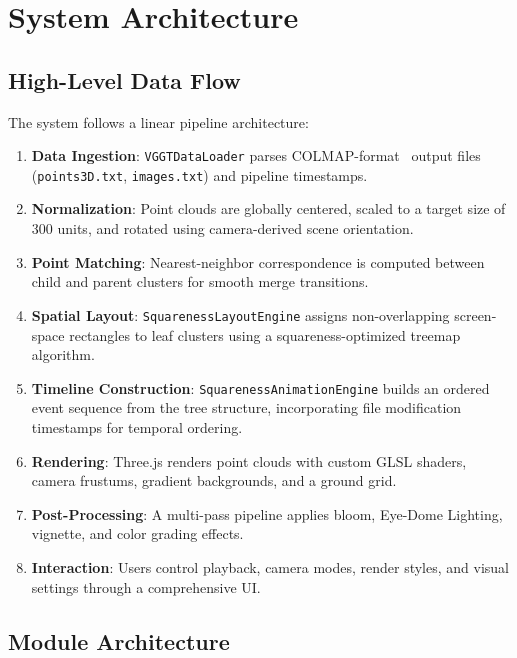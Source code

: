 \documentclass[11pt, letterpaper]{article}
\begin{document}
\section{System Architecture}

\subsection{High-Level Data Flow}

The system follows a linear pipeline architecture:

\begin{enumerate}
    \item \textbf{Data Ingestion}: \texttt{VGGTDataLoader} parses COLMAP-format~\cite{colmap} output files (\texttt{points3D.txt}, \texttt{images.txt}) and pipeline timestamps.
    \item \textbf{Normalization}: Point clouds are globally centered, scaled to a target size of 300 units, and rotated using camera-derived scene orientation.
    \item \textbf{Point Matching}: Nearest-neighbor correspondence is computed between child and parent clusters for smooth merge transitions.
    \item \textbf{Spatial Layout}: \texttt{SquarenessLayoutEngine} assigns non-overlapping screen-space rectangles to leaf clusters using a squareness-optimized treemap algorithm.
    \item \textbf{Timeline Construction}: \texttt{SquarenessAnimationEngine} builds an ordered event sequence from the tree structure, incorporating file modification timestamps for temporal ordering.
    \item \textbf{Rendering}: Three.js renders point clouds with custom GLSL shaders, camera frustums, gradient backgrounds, and a ground grid.
    \item \textbf{Post-Processing}: A multi-pass pipeline applies bloom, Eye-Dome Lighting, vignette, and color grading effects.
    \item \textbf{Interaction}: Users control playback, camera modes, render styles, and visual settings through a comprehensive UI.
\end{enumerate}

\subsection{Module Architecture}
\end{document}
